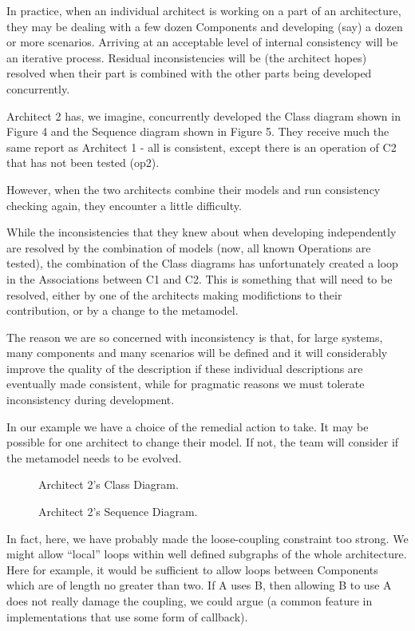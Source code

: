 \documentclass[times, 10pt,twocolumn]{article}
\begin{document}
In practice, when an individual architect is working on a part of an architecture, they may be dealing with a few dozen Components and developing (say) a dozen or more scenarios. Arriving at an acceptable level of internal consistency will be an iterative process. Residual inconsistencies will be (the architect hopes) resolved when their part is combined with the other parts being developed concurrently.

Architect 2 has, we imagine, concurrently developed the Class diagram shown in Figure 4 and the Sequence diagram shown in Figure 5. They receive much the same report as Architect 1 - all is consistent, except there is an operation of C2 that has not been tested (op2). 


However, when the two architects combine their models and run consistency checking again, they encounter a little difficulty.

While the inconsistencies that they knew about when developing independently are resolved by the combination of models (now, all known Operations are tested), the combination of the Class diagrams has unfortunately created a loop in the Associations between C1 and C2. This is something that will need to be resolved, either by one of the architects making modifictions to their contribution, or by a change to the metamodel.

The reason we are so concerned with inconsistency is that, for large systems, many components and many scenarios will be defined and it will considerably improve the quality of the description if these individual descriptions are eventually made consistent, while for pragmatic reasons we must tolerate inconsistency during development. 

In our example we have a choice of the remedial action to take. It may be possible for one architect to change their model. If not, the team will consider if the metamodel needs to be evolved. 

\begin{figure}
  \centering
   {}
   \caption{Architect 2's Class Diagram.}
\end{figure}
 
\begin{figure}
  \centering
   {}
   \caption{Architect 2's Sequence Diagram.}
\end{figure}
In fact, here, we have probably made the loose-coupling constraint too strong. We might allow ``local'' loops within well defined subgraphs of the whole architecture. Here for example, it would be sufficient to allow loops between Components which are of length no greater than two. If A uses B, then allowing B to use A does not really damage the coupling, we could argue (a common feature in implementations that use some form of callback).
\end{document}
